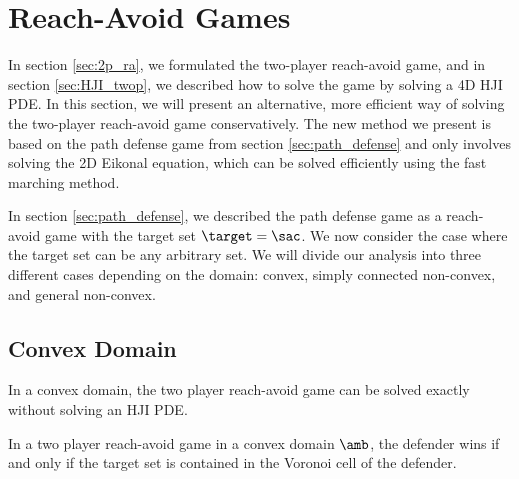 \section{Reach-Avoid Games}
\label{sec:reach_avoid}
In section \ref{sec:2p_ra}, we formulated the two-player reach-avoid game, and in section \ref{sec:HJI_twop}, we described how to solve the game by solving a 4D HJI PDE. In this section, we will present an alternative, more efficient way of solving the two-player reach-avoid game conservatively. The new method we present is based on the path defense game from section \ref{sec:path_defense} and only involves solving the 2D Eikonal equation, which can be solved efficiently using the fast marching method.

In section \ref{sec:path_defense}, we described the path defense game as a reach-avoid game with the target set $\target=\sac$. We now consider the case where the target set can be any arbitrary set. We will divide our analysis into three different cases depending on the domain: convex, simply connected non-convex, and general non-convex.

\subsection{Convex Domain}
In a convex domain, the two player reach-avoid game can be solved exactly without solving an HJI PDE.

\begin{lem} \label{lem:cvx_domain}
In a two player reach-avoid game in a convex domain $\amb$, the defender wins if and only if the target set is contained in the Voronoi cell of the defender.
\end{lem}

